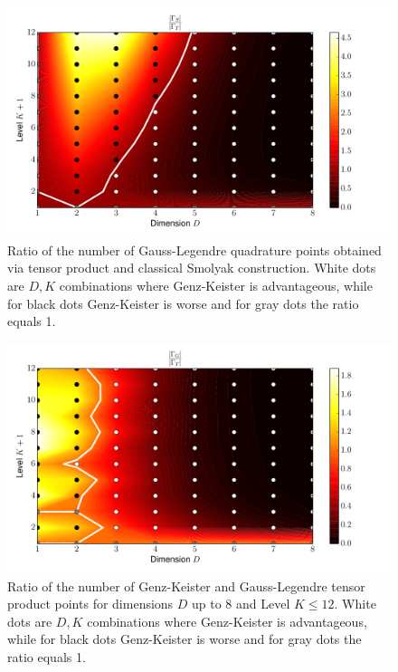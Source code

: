 \documentclass[a4paper,10pt]{article}
\begin{document}
\begin{figure}[h]
  \centering
  \includegraphics[width=0.8\linewidth]{./img/smol_legendre_ratio.pdf}
  \caption{Ratio of the number of Gauss-Legendre quadrature points obtained
  via tensor product and classical Smolyak construction. White dots are $D,K$
  combinations where Genz-Keister is advantageous, while for black dots
  Genz-Keister is worse and for gray dots the ratio equals 1.}
  \label{fig:smol_legendre_ratio}
\end{figure}

\begin{figure}[h]
  \centering
  \includegraphics[width=0.8\linewidth]{./img/gk_legendre_ratio.pdf}
  \caption{Ratio of the number of Genz-Keister and Gauss-Legendre tensor product
  points for dimensions $D$ up to 8 and Level $K \leq 12$. White dots are $D,K$
  combinations where Genz-Keister is advantageous, while for black dots
  Genz-Keister is worse and for gray dots the ratio equals 1.}
  \label{fig:gk_legendre_ratio}
\end{figure}
\end{document}
